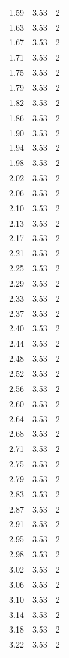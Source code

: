 \begin{longtable}{lrr}
  1.59 & 3.53 & 2 \\
  1.63 & 3.53 & 2 \\
  1.67 & 3.53 & 2 \\
  1.71 & 3.53 & 2 \\
  1.75 & 3.53 & 2 \\
  1.79 & 3.53 & 2 \\
  1.82 & 3.53 & 2 \\
  1.86 & 3.53 & 2 \\
  1.90 & 3.53 & 2 \\
  1.94 & 3.53 & 2 \\
  1.98 & 3.53 & 2 \\
  2.02 & 3.53 & 2 \\
  2.06 & 3.53 & 2 \\
  2.10 & 3.53 & 2 \\
  2.13 & 3.53 & 2 \\
  2.17 & 3.53 & 2 \\
  2.21 & 3.53 & 2 \\
  2.25 & 3.53 & 2 \\
  2.29 & 3.53 & 2 \\
  2.33 & 3.53 & 2 \\
  2.37 & 3.53 & 2 \\
  2.40 & 3.53 & 2 \\
  2.44 & 3.53 & 2 \\
  2.48 & 3.53 & 2 \\
  2.52 & 3.53 & 2 \\
  2.56 & 3.53 & 2 \\
  2.60 & 3.53 & 2 \\
  2.64 & 3.53 & 2 \\
  2.68 & 3.53 & 2 \\
  2.71 & 3.53 & 2 \\
  2.75 & 3.53 & 2 \\
  2.79 & 3.53 & 2 \\
  2.83 & 3.53 & 2 \\
  2.87 & 3.53 & 2 \\
  2.91 & 3.53 & 2 \\
  2.95 & 3.53 & 2 \\
  2.98 & 3.53 & 2 \\
  3.02 & 3.53 & 2 \\
  3.06 & 3.53 & 2 \\
  3.10 & 3.53 & 2 \\
  3.14 & 3.53 & 2 \\
  3.18 & 3.53 & 2 \\
  3.22 & 3.53 & 2 \\

\end{longtable}
